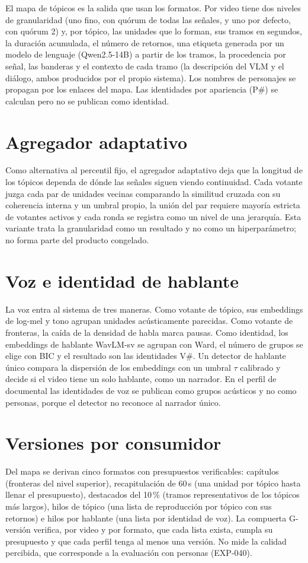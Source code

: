 El mapa de tópicos es la salida que usan los formatos. Por video tiene dos niveles de
granularidad (uno fino, con quórum de todas las señales, y uno por defecto, con quórum 2) y, por tópico, las unidades que lo forman, sus tramos en segundos, la duración
acumulada, el número de retornos, una etiqueta generada por un modelo de lenguaje
(Qwen2.5-14B) a partir de los tramos, la procedencia por señal, las banderas y el contexto de
cada tramo (la descripción del VLM y el diálogo, ambos producidos por el propio sistema). Los
nombres de personajes se propagan por los enlaces del mapa. Las identidades por apariencia
(P\#) se calculan pero no se publican como identidad.

\section{Agregador adaptativo}

Como alternativa al percentil fijo, el agregador adaptativo deja que la longitud de los
tópicos dependa de dónde las señales siguen viendo continuidad. Cada votante juzga cada par
de unidades vecinas comparando la similitud cruzada con su coherencia interna y un umbral
propio, la unión del par requiere mayoría estricta de votantes activos y cada ronda se
registra como un nivel de una jerarquía. Esta variante trata la granularidad como un
resultado y no como un hiperparámetro; no forma parte del producto congelado.

\section{Voz e identidad de hablante}

La voz entra al sistema de tres maneras. Como votante de tópico, sus embeddings de log-mel y
tono agrupan unidades acústicamente parecidas. Como votante de fronteras, la caída de la
densidad de habla marca pausas. Como identidad, los embeddings de hablante WavLM-sv
\cite{chen2022wavlm} se agrupan con Ward, el número de grupos se elige con BIC y el resultado
son las identidades V\#. Un detector de hablante único compara la dispersión de los
embeddings con un umbral $\tau$ calibrado y decide si el video tiene un solo hablante, como un
narrador. En el perfil de documental las identidades de voz se publican como grupos acústicos
y no como personas, porque el detector no reconoce al narrador único.

\section{Versiones por consumidor}

Del mapa se derivan cinco formatos con presupuestos verificables: capítulos (fronteras del
nivel superior), recapitulación de 60\,s (una unidad por tópico hasta llenar el presupuesto),
destacados del 10\,\% (tramos representativos de los tópicos más largos), hilos de tópico
(una lista de reproducción por tópico con sus retornos) e hilos por hablante (una lista por
identidad de voz). La compuerta G-versión verifica, por video y por formato, que cada lista
exista, cumpla su presupuesto y que cada perfil tenga al menos una versión. No mide la
calidad percibida, que corresponde a la evaluación con personas (EXP-040).
